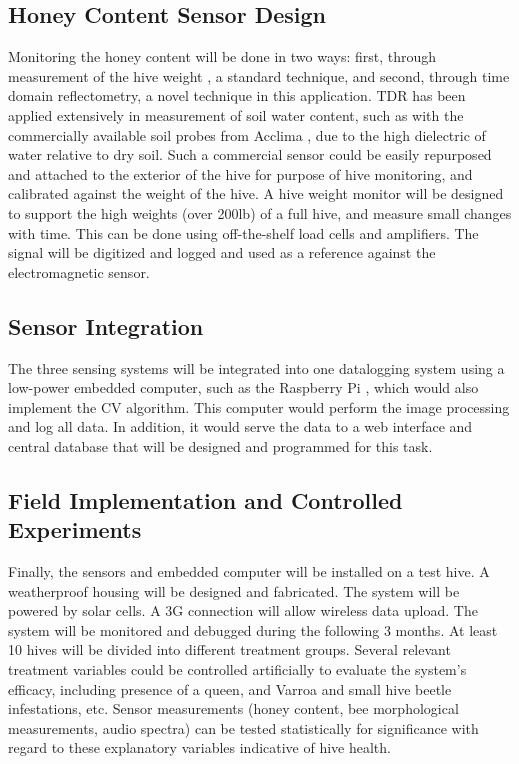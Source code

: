 \subsection{Honey Content Sensor Design}
Monitoring the honey content will be done in two ways: first, through measurement of the hive weight \cite{meikle2008within}, a standard technique, and second, through time domain reflectometry, a novel technique in this application. TDR has been applied extensively in measurement of soil water content, such as with the commercially available soil probes from Acclima \cite{blonquist2005time, schwartz2016evaluation}, due to the high dielectric of water relative to dry soil. Such a commercial sensor could be easily repurposed and attached to the exterior of the hive for purpose of hive monitoring, and calibrated against the weight of the hive. A hive weight monitor will be designed to support the high weights (over 200lb) of a full hive, and measure small changes with time. This can be done using off-the-shelf load cells and amplifiers. The signal will be digitized and logged and used as a reference against the electromagnetic sensor.

\subsection{Sensor Integration}

The three sensing systems will be integrated into one datalogging system using a low-power embedded computer, such as the Raspberry Pi \cite{upton2014raspberry}, which would also implement the CV algorithm. This computer would perform the image processing and log all data. In addition, it would serve the data to a web interface and central database that will be designed and programmed for this task. 

\subsection{Field Implementation and Controlled Experiments}

Finally, the sensors and embedded computer will be installed on a test hive. A weatherproof housing will be designed and fabricated.  The system will be powered by solar cells. A 3G connection will allow wireless data upload. The system will be monitored and debugged during the following 3 months. At least 10 hives will be divided into different treatment groups. Several relevant treatment variables could be controlled
artificially to evaluate the system’s efficacy, including presence of a queen, and Varroa and small hive beetle infestations, etc. Sensor measurements (honey content, bee morphological measurements, audio spectra) can be tested statistically for significance with regard to these explanatory variables indicative of hive health.

